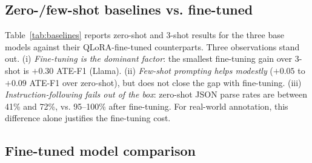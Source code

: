 \documentclass[runningheads]{llncs}
\begin{document}
\subsection{Zero-/few-shot baselines vs. fine-tuned}
\label{sec:results:baselines}

Table~\ref{tab:baselines} reports zero-shot and 3-shot results for the
three base models against their QLoRA-fine-tuned counterparts. Three
observations stand out. (i) \emph{Fine-tuning is the dominant factor}:
the smallest fine-tuning gain over 3-shot is $+0.30$ ATE-F1 (Llama). (ii)
\emph{Few-shot prompting helps modestly} ($+0.05$ to $+0.09$ ATE-F1 over
zero-shot), but does not close the gap with fine-tuning. (iii)
\emph{Instruction-following fails out of the box}: zero-shot JSON parse
rates are between 41\% and 72\%, vs. 95--100\% after fine-tuning. For
real-world annotation, this difference alone justifies the fine-tuning
cost.

\begin{table}[!htbp]
\centering
\caption{Zero-shot, 3-shot and fine-tuned ABSA performance on the
618-sentence held-out test split. ATE-F1 is exact-match; E2E-F1 is the
joint aspect--polarity pair F1; ``\%JSON'' is the JSON parse success
rate. Best per column in \textbf{bold}.}
\label{tab:baselines}
\renewcommand{\arraystretch}{1.1}
\setlength{\tabcolsep}{4pt}
\end{table}

\subsection{Fine-tuned model comparison}
\label{sec:results:finetuned}
\end{document}
